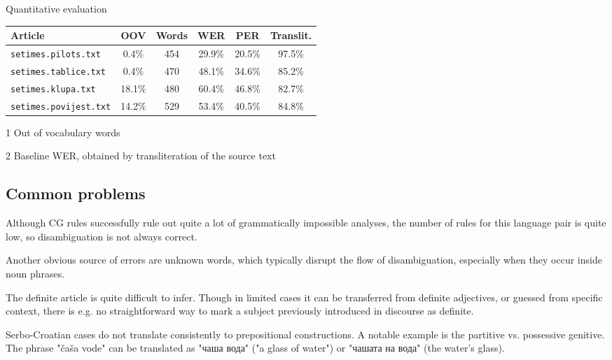 \documentclass{book}
\begin{document}
\begin{savenotes}
\begin{threeparttable}
\caption{Quantitative evaluation}\label{tab:quantitative}
\begin{tabular}{l|c|c|c|c|c}
Article & OOV\tnote{1} & Words & WER & PER & Translit.\tnote{2}\\
\hline
\texttt{setimes.pilots.txt} & 0.4\% & 454 & 29.9\% & 20.5\% & 97.5\% \\
\texttt{setimes.tablice.txt} & 0.4\% & 470 & 48.1\% & 34.6\% & 85.2\% \\
\texttt{setimes.klupa.txt} & 18.1\% & 480 & 60.4\% & 46.8\% & 82.7\% \\
\texttt{setimes.povijest.txt} & 14.2\% & 529 & 53.4\% & 40.5\% & 84.8\% \\
\hline
\end{tabular}
\begin{tablenotes}
\item[1]{{\footnotesize Out of vocabulary words}}
\item[2]{{\footnotesize Baseline WER, obtained by transliteration of the source text}}
\end{tablenotes}
\end{threeparttable}
\end{savenotes}



\subsection*{Common problems}

Although CG rules successfully rule out quite a lot of
grammatically impossible analyses, the number of rules for this language pair
is quite low, so disambiguation is not always correct.

Another obvious source of errors are unknown words, which typically disrupt 
the flow of disambiguation, especially when they occur inside noun phrases.

The definite article is quite difficult to infer. Though in limited
cases it can be transferred from definite adjectives, or guessed from
specific context, there is e.g. no straightforward way to mark a subject previously
introduced in discourse as definite.

Serbo-Croatian cases do not translate consistently to prepositional constructions.
A notable example is the partitive vs. possessive genitive. The phrase "čaša vode"
can be translated as "чаша вода" ("a glass of water") or "чашата на вода" 
(the water's glass).
\end{document}
